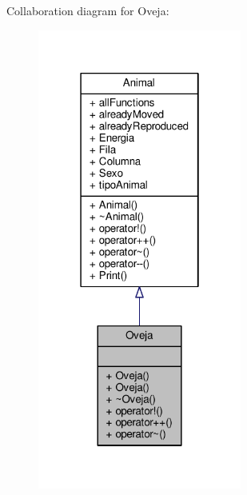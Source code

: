 Collaboration diagram for Oveja\+:\nopagebreak
\begin{figure}[H]
\begin{center}
\leavevmode
\includegraphics[width=190pt]{classOveja__coll__graph}
\end{center}
\end{figure}
